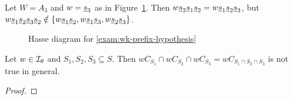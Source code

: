 \begin{exam}
	Let $W = A_3$ and $w = \underline{s}_3$ as in Figure~\ref{fig:wk-prefix-counterexample}. Then $w \underline{s}_2 \underline{s}_1 \underline{s}_2 = w \underline{s}_1 \underline{s}_2 \underline{s}_3$, but $w \underline{s}_1 \underline{s}_2 \underline{s}_3 \underline{s}_2 \notin \{ w \underline{s}_1 \underline{s}_2, w \underline{s}_1 \underline{s}_3, w \underline{s}_2 \underline{s}_3 \}$.

	\begin{figure}[ht]
		\centering
		
		\label{fig:wk-prefix-counterexample}
		\caption{Hasse diagram for \ref{exam:wk-prefix-hypothesis}}
	\end{figure}
\end{exam}

\begin{exam}
	Let $w \in \mathcal{I}_{\theta}$ and $S_1,S_2,S_3 \subseteq S$. Then $wC_{S_1} \cap wC_{S_2} \cap wC_{S_3} = wC_{S_1 \cap S_2 \cap S_3}$ is not true in general.

	\begin{proof}
		\todo
	\end{proof}
\end{exam}



